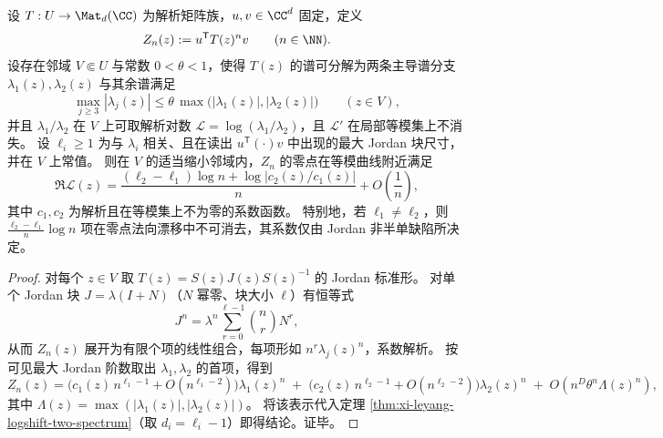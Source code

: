 \begin{theorem}\label{thm:xi-leyang-jordan-logshift}
设 \(T:U\to\Mat_d(\CC)\) 为解析矩阵族，\(u,v\in\CC^d\) 固定，定义
\[
Z_n(z):=u^{\mathsf T}T(z)^n v\qquad(n\in\NN).
\]
设存在邻域 \(V\Subset U\) 与常数 \(0<\theta<1\)，使得 \(T(z)\) 的谱可分解为两条主导谱分支 \(\lambda_1(z),\lambda_2(z)\) 与其余谱满足
\[
\max_{j\ge 3}|\lambda_j(z)|\le \theta\,\max\bigl(|\lambda_1(z)|,|\lambda_2(z)|\bigr)\qquad(z\in V),
\]
并且 \(\lambda_1/\lambda_2\) 在 \(V\) 上可取解析对数 \(\mathcal{L}=\log(\lambda_1/\lambda_2)\)，且 \(\mathcal{L}'\) 在局部等模集上不消失。
设 \(\ell_i\ge 1\) 为与 \(\lambda_i\) 相关、且在读出 \(u^{\mathsf T}(\cdot)v\) 中出现的最大 Jordan 块尺寸，并在 \(V\) 上常值。
则在 \(V\) 的适当缩小邻域内，\(Z_n\) 的零点在等模曲线附近满足
\[
\Re\mathcal{L}(z)=\frac{(\ell_2-\ell_1)\log n+\log|c_2(z)/c_1(z)|}{n}+O\!\left(\frac1n\right),
\]
其中 \(c_1,c_2\) 为解析且在等模集上不为零的系数函数。
特别地，若 \(\ell_1\neq \ell_2\)，则 \(\frac{\ell_2-\ell_1}{n}\log n\) 项在零点法向漂移中不可消去，其系数仅由 Jordan 非半单缺陷所决定。
\end{theorem}
\begin{proof}
对每个 \(z\in V\) 取 \(T(z)=S(z)J(z)S(z)^{-1}\) 的 Jordan 标准形。
对单个 Jordan 块 \(J=\lambda(I+N)\)（\(N\) 幂零、块大小 \(\ell\)）有恒等式
\[
J^n=\lambda^n\sum_{r=0}^{\ell-1}\binom{n}{r}N^r,
\]
从而 \(Z_n(z)\) 展开为有限个项的线性组合，每项形如 \(n^r\lambda_j(z)^n\)，系数解析。
按可见最大 Jordan 阶数取出 \(\lambda_1,\lambda_2\) 的首项，得到
\[
Z_n(z)=\bigl(c_1(z)\,n^{\ell_1-1}+O(n^{\ell_1-2})\bigr)\lambda_1(z)^n
\;+\;\bigl(c_2(z)\,n^{\ell_2-1}+O(n^{\ell_2-2})\bigr)\lambda_2(z)^n
\;+\;O(n^{D}\theta^n\Lambda(z)^n),
\]
其中 \(\Lambda(z)=\max(|\lambda_1(z)|,|\lambda_2(z)|)\)。
将该表示代入定理 \ref{thm:xi-leyang-logshift-two-spectrum}（取 \(d_i=\ell_i-1\)）即得结论。证毕。
\end{proof}

